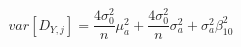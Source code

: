 \begin{equation}
var[D_{Y,j}] = \frac{4\sigma_0^2}{n}\mu_{a}^2 + \frac{4\sigma_0^2}{n}\sigma_{a}^2 + \sigma_{a}^2\beta_{10}^2
\end{equation}